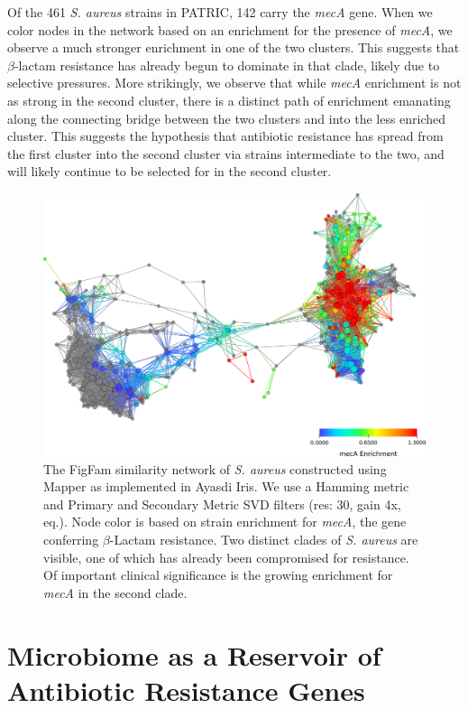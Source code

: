 Of the 461 \emph{S. aureus} strains in PATRIC, 142 carry the \emph{mecA} gene.
When we color nodes in the network based on an enrichment for the presence of \emph{mecA}, we observe a much stronger enrichment in one of the two clusters.
This suggests that $\beta$-lactam resistance has already begun to dominate in that clade, likely due to selective pressures.
More strikingly, we observe that while \emph{mecA} enrichment is not as strong in the second cluster, there is a distinct path of enrichment emanating along the connecting bridge between the two clusters and into the less enriched cluster.
This suggests the hypothesis that antibiotic resistance has spread from the first cluster into the second cluster via strains intermediate to the two, and will likely continue to be selected for in the second cluster.

\begin{figure}[t]
\centering
\includegraphics[width=\textwidth]{./fig/saureus_figfam_network.png}
\caption[FigFam similarity network of \emph{S. aureus}]{The FigFam similarity network of \emph{S. aureus} constructed using Mapper as implemented in Ayasdi Iris. We use a Hamming metric and Primary and Secondary Metric SVD filters (res: 30, gain 4x, eq.). Node color is based on strain enrichment for \emph{mecA}, the gene conferring $\beta$-Lactam resistance. Two distinct clades of \emph{S. aureus} are visible, one of which has already been compromised for resistance. Of important clinical significance is the growing enrichment for \emph{mecA} in the second clade.}
\label{fig:saureus_figfam_network}
\end{figure}

\section{Microbiome as a Reservoir of Antibiotic Resistance Genes}

